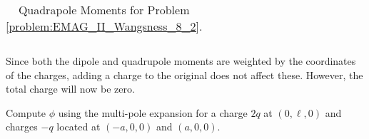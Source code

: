 \begin{solution}
\begin{table}[H]
{\begin{tabular}{|c|c|c|c|}
                                \hline
                            \end{tabular}
                        }
                        \caption{Quadrapole Moments for Problem
                                 \ref{problem:EMAG_II_Wangsness_8_2}.}
                        \label{tab:EMAG_2_Problem_8_2_%
                               Wangsness_Quadrupole}
                    \end{table}
                    Since both the dipole and quadrupole moments
                    are weighted by the coordinates of the charges,
                    adding a charge to the original does not affect
                    these. However, the total charge will now be zero.
                \end{solution}
                \begin{problem}
                    \label{problem:EMAG_II_Wangsness_8_4}
                    Compute $\phi$ using the multi-pole expansion for a
                    charge $2q$ at $(0,\ell,0)$ and charges $-q$
                    located at $(-a,0,0)$ and $(a,0,0)$.
                \end{problem}

